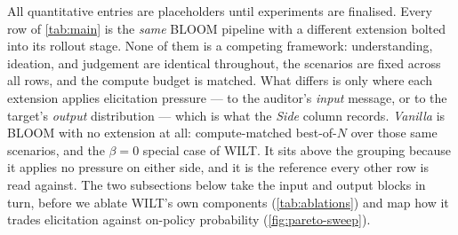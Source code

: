 \documentclass{article}
\theoremstyle{plain}
\theoremstyle{definition}
\theoremstyle{remark}
\begin{document}
All quantitative entries are placeholders until experiments are finalised.
Every row of \cref{tab:main} is the \emph{same} BLOOM pipeline with a different extension bolted into its rollout stage.
None of them is a competing framework: understanding, ideation, and judgement are identical throughout, the scenarios are fixed across all rows, and the compute budget is matched.
What differs is only where each extension applies elicitation pressure --- to the auditor's \emph{input} message, or to the target's \emph{output} distribution --- which is what the \emph{Side} column records.
\emph{Vanilla} is BLOOM with no extension at all: compute-matched best-of-$N$ over those same scenarios, and the $\beta = 0$ special case of WILT.
It sits above the grouping because it applies no pressure on either side, and it is the reference every other row is read against.
The two subsections below take the input and output blocks in turn, before we ablate WILT's own components (\cref{tab:ablations}) and map how it trades elicitation against on-policy probability (\cref{fig:pareto-sweep}).
\end{document}
